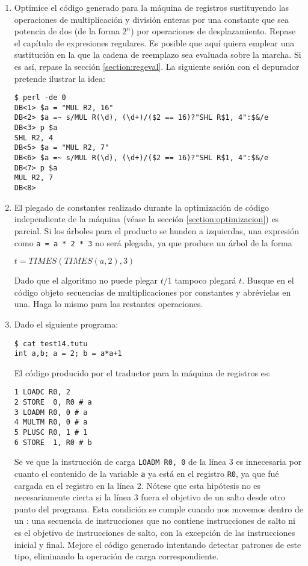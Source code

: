 \label{practica:peephole}
\begin{enumerate}
\item
Optimice el código generado para la máquina de registros sustituyendo
las operaciones de multiplicación y división enteras por una constante que sea
potencia de dos (de la forma $2^n$) por operaciones de desplazamiento.
Repase el capítulo de expresiones regulares. Es posible que aquí quiera emplear
una sustitución en la que la cadena de reemplazo
sea evaluada sobre la marcha. Si es así, repase la sección
\ref{section:regeval}. La siguiente sesión con el depurador
pretende ilustrar la idea:
\begin{verbatim}
$ perl -de 0
DB<1> $a = "MUL R2, 16"
DB<2> $a =~ s/MUL R(\d), (\d+)/($2 == 16)?"SHL R$1, 4":$&/e
DB<3> p $a
SHL R2, 4
DB<5> $a = "MUL R2, 7"
DB<6> $a =~ s/MUL R(\d), (\d+)/($2 == 16)?"SHL R$1, 4":$&/e
DB<7> p $a
MUL R2, 7
DB<8>
\end{verbatim}

\item
El plegado de constantes realizado durante la optimización de código independiente
de la máquina (véase la sección
\ref{section:optimizacion})
es parcial. Si los árboles para el producto se hunden a izquierdas, una expresión
como \verb|a = a * 2 * 3| no será plegada, ya que produce
un árbol de la forma 

\begin{center}
$t = TIMES(TIMES(a,2),3)$
\end{center}

Dado que el algoritmo no
puede plegar $t/1$ tampoco plegará $t$.  Busque en el código objeto
secuencias de multiplicaciones 
por constantes y abrévielas en una. Haga lo mismo para las restantes operaciones.

\item
Dado el siguiente programa:
\begin{verbatim}
$ cat test14.tutu
int a,b; a = 2; b = a*a+1
\end{verbatim}
El código producido por el traductor para la máquina de registros es:
\begin{verbatim}
1 LOADC R0, 2
2 STORE  0, R0 # a
3 LOADM R0, 0 # a
4 MULTM R0, 0 # a
5 PLUSC R0, 1 # 1
6 STORE  1, R0 # b
\end{verbatim}
Se ve que la instrucción de carga \verb|LOADM R0, 0| de la 
línea 3 es innecesaria por cuanto
el contenido de la variable \verb|a| ya está en el registro \verb|R0|, 
ya que fué cargada en el registro en la línea 2.
Nótese que esta hipótesis no es necesariamente cierta
si la línea 3 fuera el objetivo de un salto desde 
otro punto del programa. Esta condición se cumple
cuando nos movemos dentro de un : 
una secuencia de instrucciones que no contiene instrucciones
de salto ni es el objetivo de instrucciones de salto, con la excepción
de las instrucciones inicial y final.
Mejore el código generado 
intentando detectar patrones
de este tipo, eliminando la operación de carga correspondiente.
\end{enumerate}
